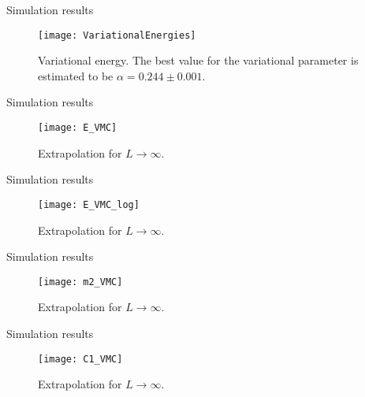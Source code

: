 \documentclass[10pt, compress, protectframetitle, handout]{beamer}
\begin{document}
\begin{frame}{Simulation results}

	\begin{figure}
		\centering
		\texttt{[image: VariationalEnergies]}
		\label{fig:VariationalEnergies}
		\caption{Variational energy. The best value for the variational parameter is estimated to be $\alpha = 0.244 \pm 0.001$.}
	\end{figure}
	
\end{frame}

\begin{frame}{Simulation results}

	\begin{figure}
		\centering
		\texttt{[image: E\_VMC]}
		\label{fig:E_VMC}
		\caption{Extrapolation for $L \to \infty$.}
	\end{figure}
	
\end{frame}

\begin{frame}{Simulation results}

	\begin{figure}
		\centering
		\texttt{[image: E\_VMC\_log]}
		\label{fig:E_VMC_log}
		\caption{Extrapolation for $L \to \infty$.}
	\end{figure}
	
\end{frame}

%
%	

\begin{frame}{Simulation results}

	\begin{figure}
		\centering
		\texttt{[image: m2\_VMC]}
		\label{fig:m2_VMC}
		\caption{Extrapolation for $L \to \infty$.}
	\end{figure}
	
\end{frame}

\begin{frame}{Simulation results}

	\begin{figure}
		\centering
		\texttt{[image: C1\_VMC]}
		\label{fig:C1_VMC}
		\caption{Extrapolation for $L \to \infty$.}
	\end{figure}
	
\end{frame}
\end{document}
